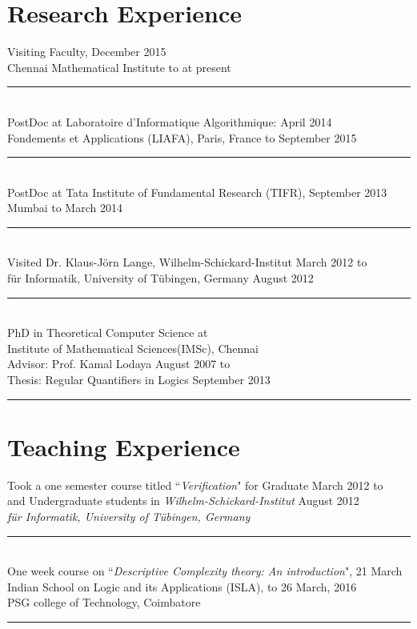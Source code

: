 \documentclass[margin]{res}
\begin{document}
\begin{resume}
\section{Research Experience}Visiting Faculty, 	\hfill December 2015 \\
					Chennai Mathematical Institute \hfill to at present \\
					\noindent\rule{13cm}{0.4pt} \\
					PostDoc at Laboratoire d{'}Informatique Algorithmique: \hfill April 2014\\
					Fondements et Applications (LIAFA),	Paris, France \hfill to September 2015 \\
					\noindent\rule{13cm}{0.4pt} \\
					PostDoc at Tata Institute of Fundamental Research (TIFR),  \hfill September 2013 \\
					Mumbai	\hfill	to March 2014
					\noindent\rule{13cm}{0.4pt} \\					
					Visited Dr. Klaus-J\"orn Lange, Wilhelm-Schickard-Institut \hfill March 2012 to\\
					f\"ur Informatik, University of T\"ubingen, Germany \hfill August 2012 
					\noindent\rule{13cm}{0.4pt} \\
					PhD in Theoretical Computer Science at \\
					Institute of Mathematical Sciences(IMSc), Chennai \\
					Advisor: Prof. Kamal Lodaya \hfill August 2007 to \\
					Thesis: Regular Quantifiers in Logics \hfill September 2013 \\
					\noindent\rule{13cm}{0.4pt} 
									
\section{Teaching Experience}
					Took a one semester course titled ``\emph{Verification}" for Graduate \hfill March 2012 to  \\
					and Undergraduate students in \emph{Wilhelm-Schickard-Institut} \hfill August 2012\\ 
					\emph{f\"ur Informatik, University of T\"ubingen, Germany} \\
					\noindent\rule{13cm}{0.4pt} \\
					One week course on ``\emph{Descriptive Complexity theory: An introduction}", \hfill 21 March \\
					 Indian School on Logic and its Applications (ISLA),   \hfill to 26 March, 2016 \\
					 PSG college of Technology, Coimbatore \\
					\noindent\rule{13cm}{0.4pt} 


\end{resume}
\end{document}
